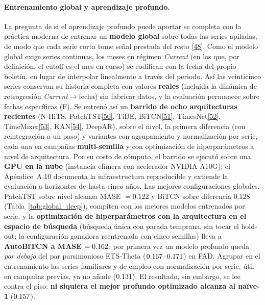 \documentclass[12pt,letterpaper]{report}
\newcommand{\cita}[1]{\hyperref[bib:#1]{[#1]}}
\begin{document}
\paragraph{Entrenamiento global y aprendizaje profundo.} La pregunta de si el
aprendizaje profundo puede aportar se completa con la práctica moderna de entrenar un
\textbf{modelo global} sobre todas las series apiladas, de modo que cada serie corta tome
señal prestada del resto \cita{48}. Como el modelo global exige series continuas, los meses en
régimen \textit{Current} (en los que, por definición, el cutoff es el mes en curso) se
codifican con la fecha del propio boletín, en lugar de interpolar linealmente a través del
periodo. Así las veinticinco series conservan su historia completa con valores
\textbf{reales} (incluida la dinámica de retrogresión \textit{Current}$\rightarrow$fecha)
sin fabricar datos, y la evaluación permanece sobre fechas específicas (F). Se entrenó así un
\textbf{barrido de ocho arquitecturas recientes}
(N-HiTS, PatchTST\cita{50}, TiDE, BiTCN\cita{51}, TimesNet\cita{52}, TimeMixer\cita{53}, KAN\cita{54}, DeepAR), sobre el nivel,
la primera diferencia (con reintegración a un paso) y variantes con agrupamiento y normalización
por serie, cada una en campañas \textbf{multi-semilla} y con optimización de hiperparámetros a nivel
de arquitectura. Por su costo de cómputo, el barrido se ejecutó sobre una \textbf{GPU en la nube}
(instancia efímera con acelerador NVIDIA A10G); el Apéndice~A.10 documenta la infraestructura
reproducible y extiende la evaluación a horizontes de hasta cinco años. Las mejores
configuraciones globales, PatchTST sobre nivel alcanza MASE $=0.122$ y BiTCN sobre
diferencia $0.128$ (Tabla~\ref{tab:global_deep}), compiten con los mejores modelos
entrenados por serie, y la \textbf{optimización de hiperparámetros con la arquitectura en
el espacio de búsqueda} (búsqueda única con parada temprana, sin tocar el hold-out; la
configuración ganadora reentrenada con cinco semillas) lleva a \textbf{AutoBiTCN a MASE
$=0.162$}: por primera vez un modelo profundo queda \textit{por debajo}
del par parsimonioso ETS-Theta ($0.167$--$0.171$) en FAD. Agrupar
en el entrenamiento las series familiares y de empleo con normalización por serie, útil
en campañas previas, ya no añade ($0.131$). El resultado, sin embargo, se lee contra el
piso: \textbf{ni siquiera el mejor profundo optimizado alcanza al naïve-1} ($0.157$).
\end{document}
